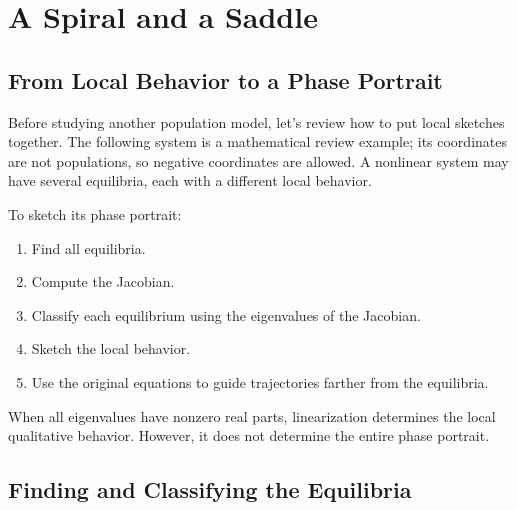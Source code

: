 \documentclass[10pt,letterpaper]{article}
\begin{document}
\section{A Spiral and a Saddle}

\subsection{From Local Behavior to a Phase Portrait}

Before studying another population model, let's review how to put
local sketches together. The following system is a mathematical review
example; its coordinates are not populations, so negative coordinates
are allowed. A nonlinear system may have several equilibria, each with
a different local behavior.

To sketch its phase portrait:
\begin{enumerate}
    \item Find all equilibria.
    \item Compute the Jacobian.
    \item Classify each equilibrium using the
    eigenvalues of the Jacobian.
    \item Sketch the local behavior.
    \item Use the original equations to guide
    trajectories farther from the equilibria.
\end{enumerate}

When all eigenvalues have nonzero real parts,
linearization determines the local qualitative
behavior. However, it does not determine the
entire phase portrait.

\subsection{Finding and Classifying the Equilibria}
\end{document}
